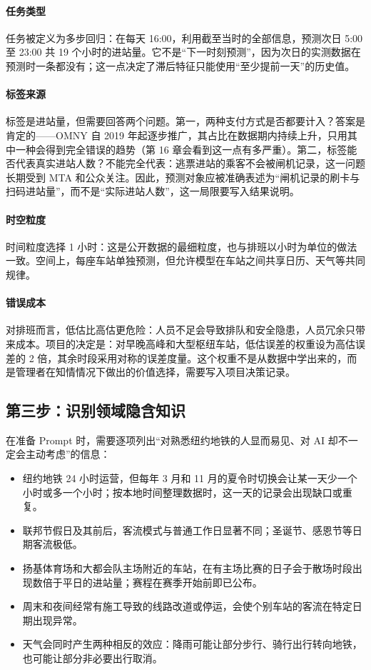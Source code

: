\paragraph{任务类型} 任务被定义为多步回归：在每天 16:00，利用截至当时的全部信息，预测次日 5:00 至 23:00 共 19 个小时的进站量。它不是“下一时刻预测”，因为次日的实测数据在预测时一条都没有；这一点决定了滞后特征只能使用“至少提前一天”的历史值。

\paragraph{标签来源} 标签是进站量，但需要回答两个问题。第一，两种支付方式是否都要计入？答案是肯定的——OMNY 自 2019 年起逐步推广，其占比在数据期内持续上升，只用其中一种会得到完全错误的趋势（第 16 章会看到这一点有多严重）。第二，标签能否代表真实进站人数？不能完全代表：逃票进站的乘客不会被闸机记录，这一问题长期受到 MTA 和公众关注。因此，预测对象应被准确表述为“闸机记录的刷卡与扫码进站量”，而不是“实际进站人数”，这一局限要写入结果说明。

\paragraph{时空粒度} 时间粒度选择 1 小时：这是公开数据的最细粒度，也与排班以小时为单位的做法一致。空间上，每座车站单独预测，但允许模型在车站之间共享日历、天气等共同规律。

\paragraph{错误成本} 对排班而言，低估比高估更危险：人员不足会导致排队和安全隐患，人员冗余只带来成本。项目的决定是：对早晚高峰和大型枢纽车站，低估误差的权重设为高估误差的 2 倍，其余时段采用对称的误差度量。这个权重不是从数据中学出来的，而是管理者在知情情况下做出的价值选择，需要写入项目决策记录。

\subsection{第三步：识别领域隐含知识}

在准备 Prompt 时，需要逐项列出“对熟悉纽约地铁的人显而易见、对 AI 却不一定会主动考虑”的信息：

\begin{itemize}
  \item 纽约地铁 24 小时运营，但每年 3 月和 11 月的夏令时切换会让某一天少一个小时或多一个小时；按本地时间整理数据时，这一天的记录会出现缺口或重复。
  \item 联邦节假日及其前后，客流模式与普通工作日显著不同；圣诞节、感恩节等日期客流极低。
  \item 扬基体育场和大都会队主场附近的车站，在有主场比赛的日子会于散场时段出现数倍于平日的进站量；赛程在赛季开始前即已公布。
  \item 周末和夜间经常有施工导致的线路改道或停运，会使个别车站的客流在特定日期出现异常。
  \item 天气会同时产生两种相反的效应：降雨可能让部分步行、骑行出行转向地铁，也可能让部分非必要出行取消。
\end{itemize}

